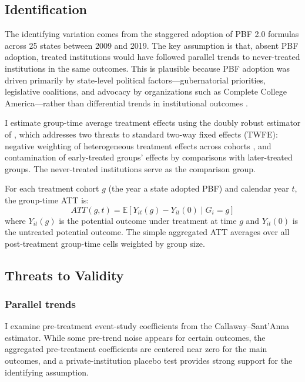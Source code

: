 \documentclass[12pt]{article}
\newcommand{\E}{\mathbb{E}}
\begin{document}
\subsection{Identification}

The identifying variation comes from the staggered adoption of PBF 2.0 formulas across 25 states between 2009 and 2019. The key assumption is that, absent PBF adoption, treated institutions would have followed parallel trends to never-treated institutions in the same outcomes. This is plausible because PBF adoption was driven primarily by state-level political factors---gubernatorial priorities, legislative coalitions, and advocacy by organizations such as Complete College America---rather than differential trends in institutional outcomes \citep{dougherty2015performance}.

I estimate group-time average treatment effects using the doubly robust estimator of \citet{callaway2021difference}, which addresses two threats to standard two-way fixed effects (TWFE): negative weighting of heterogeneous treatment effects across cohorts \citep{goodman2021difference}, and contamination of early-treated groups' effects by comparisons with later-treated groups. The never-treated institutions serve as the comparison group.

For each treatment cohort $g$ (the year a state adopted PBF) and calendar year $t$, the group-time ATT is:
\begin{equation}
  ATT(g,t) = \E\!\left[Y_{it}(g) - Y_{it}(0) \mid G_i = g\right]
\end{equation}
where $Y_{it}(g)$ is the potential outcome under treatment at time $g$ and $Y_{it}(0)$ is the untreated potential outcome. The simple aggregated ATT averages over all post-treatment group-time cells weighted by group size.

\subsection{Threats to Validity}

\subsubsection*{Parallel trends} I examine pre-treatment event-study coefficients from the Callaway--Sant'Anna estimator. While some pre-trend noise appears for certain outcomes, the aggregated pre-treatment coefficients are centered near zero for the main outcomes, and a private-institution placebo test provides strong support for the identifying assumption.
\end{document}
